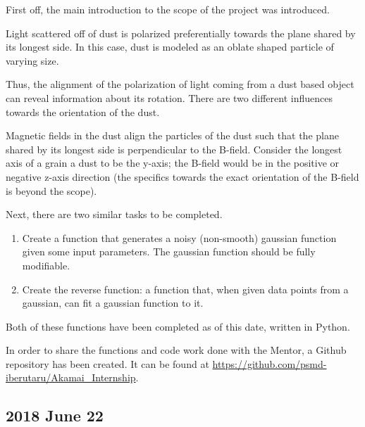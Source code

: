\documentclass[twocolumn]{article}
\begin{document}
\begin{meetingnotes*}
	First off, the main introduction to the scope of the project was introduced.

	Light scattered off of dust is polarized preferentially towards the plane shared by its longest side. In this case, dust is modeled as an oblate shaped particle of varying size.

	Thus, the alignment of the polarization of light coming from a dust based object can reveal information about its rotation. There are two different influences towards the orientation of the dust. 

	Magnetic fields in the dust align the particles of the dust such that the plane shared by its longest side is perpendicular to the B-field. Consider the longest axis of a grain a dust to be the y-axis; the B-field would be in the positive or negative z-axis direction (the specifics towards the exact orientation of the B-field is beyond the scope).

	Next, there are two similar tasks to be completed.
	\begin{enumerate}
		\item Create a function that generates a noisy (non-smooth) gaussian function given some input parameters. The gaussian function should be fully modifiable. 
		\item Create the reverse function: a function that, when given data points from a gaussian, can fit a gaussian function to it.
	\end{enumerate}
\end{meetingnotes*}

Both of these functions have been completed as of this date, written in Python. 

In order to share the functions and code work done with the Mentor, a Github repository has been created. It can be found at \url{https://github.com/psmd-iberutaru/Akamai_Internship}.

\subsection{2018 June 22}
\end{document}
